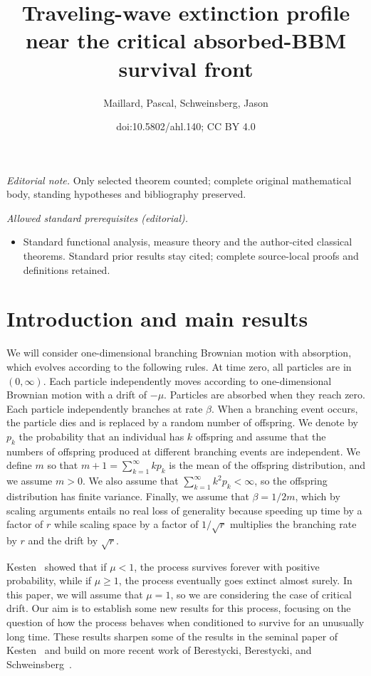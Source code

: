 \documentclass[10pt]{amsart}
\title{Traveling-wave extinction profile near the critical absorbed-BBM survival front}
\author{Maillard, Pascal, Schweinsberg, Jason}
\date{doi:10.5802/ahl.140; CC BY 4.0}
\theoremstyle{definition}\newtheorem{defi}[theo]{Definition}\newtheorem{rema}[theo]{Remark}\newtheorem{exam}[theo]{Example}\newtheorem{exem}[theo]{Example}\newtheorem{nota}[theo]{Notation}
\newcommand{\1} {\mathds{1}}
\begin{document}
\maketitle
\noindent\textit{Editorial note.} Only selected theorem counted; complete original mathematical body, standing hypotheses and bibliography preserved.\par\medskip
\noindent\textit{Allowed standard prerequisites (editorial).}\begin{itemize}
\item Standard functional analysis, measure theory and the author-cited classical theorems. Standard prior results stay cited; complete source-local proofs and definitions retained.
\end{itemize}\medskip

\section{Introduction and main results}

We will consider one-dimensional branching Brownian motion with absorption, which evolves according to the following rules. At time zero, all particles are in $(0, \infty)$. Each particle independently moves according to one-dimensional Brownian motion with a drift of $-\mu$. Particles are absorbed when they reach zero. Each particle independently branches at rate $\beta$. When a branching event occurs, the particle dies and is replaced by a random number of offspring. We denote by $p_k$ the probability that an individual has $k$ offspring and assume that the numbers of offspring produced at different branching events are independent. We define $m$ so that $m + 1 = \sum_{k=1}^{\infty} kp_k$ is the mean of the offspring distribution, and we assume $m > 0$. We also assume that $\sum_{k=1}^{\infty} k^2 p_k < \infty$, so the offspring distribution has finite variance. Finally, we assume that $\beta = 1/2m$, which by scaling arguments entails no real loss of generality because speeding up time by a factor of $r$ while scaling space by a factor of $1/\sqrt{r}$ multiplies the branching rate by $r$ and the drift by $\sqrt{r}$.

Kesten~\cite{kesten} showed that if $\mu < 1$, the process survives forever with positive probability, while if $\mu \geq 1$, the process eventually goes extinct almost surely. In this paper, we will assume that $\mu = 1$, so we are considering the case of critical drift. Our aim is to establish some new results for this process, focusing on the question of how the process behaves when conditioned to survive for an unusually long time. These results sharpen some of the results in the seminal paper of Kesten~\cite{kesten} and build on more recent work of Berestycki, Berestycki, and Schweinsberg~\cite{bbs, bbs3}.
\end{document}
